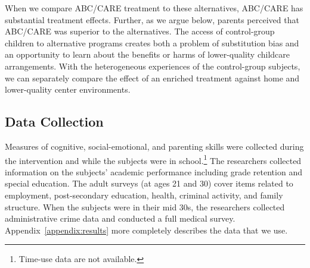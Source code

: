 When we compare ABC/CARE treatment to these alternatives, ABC/CARE has substantial treatment effects. Further, as we argue below, parents perceived that ABC/CARE was superior to the alternatives. The access of control-group children to alternative programs creates both a problem of substitution bias \citep{Heckman_1992_randomization,Heckman_Hohmann_etal_2000_QJE, Kline_Walters_2016_QJE} and an opportunity to learn about the benefits or harms of lower-quality childcare arrangements. With the heterogeneous experiences of the control-group subjects, we can separately compare the effect of an enriched treatment against home and lower-quality center environments.

\subsection{Data Collection}

Measures of cognitive, social-emotional, and parenting skills were collected during the intervention and while the subjects were in school.\footnote{Time-use data are not available.} The researchers collected information on the subjects' academic performance including grade retention and special education. The adult surveys (at ages 21 and 30) cover items related to employment, post-secondary education, health, criminal activity, and family structure. When the subjects were in their mid 30s, the researchers collected administrative crime data and conducted a full medical survey. Appendix~\ref{appendix:results} more completely describes the data that we use.



